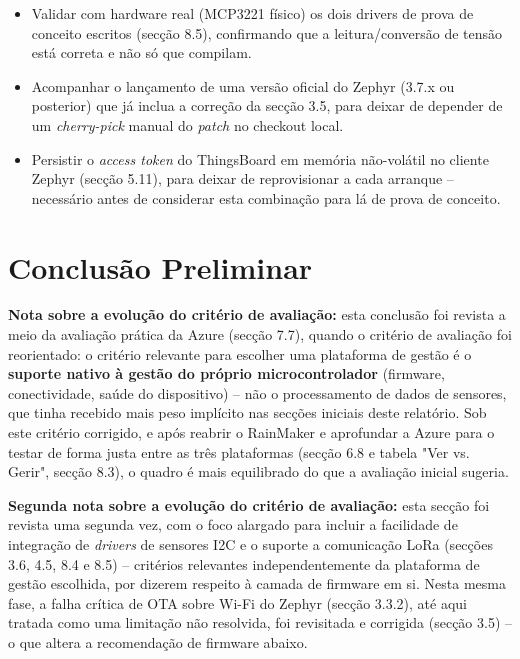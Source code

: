 \documentclass[a4paper,12pt]{article}
\begin{document}
\begin{itemize}
    \item Validar com hardware real (MCP3221 físico) os dois drivers de prova de conceito escritos (secção 8.5), confirmando que a leitura/conversão de tensão está correta e não só que compilam.
    \item Acompanhar o lançamento de uma versão oficial do Zephyr (3.7.x ou posterior) que já inclua a correção da secção 3.5, para deixar de depender de um \textit{cherry-pick} manual do \textit{patch} no checkout local.
    \item Persistir o \textit{access token} do ThingsBoard em memória não-volátil no cliente Zephyr (secção 5.11), para deixar de reprovisionar a cada arranque -- necessário antes de considerar esta combinação para lá de prova de conceito.
\end{itemize}

\section{Conclusão Preliminar}
\textbf{Nota sobre a evolução do critério de avaliação:} esta conclusão foi revista a meio da avaliação prática da Azure (secção 7.7), quando o critério de avaliação foi reorientado: o critério relevante para escolher uma plataforma de gestão é o \textbf{suporte nativo à gestão do próprio microcontrolador} (firmware, conectividade, saúde do dispositivo) -- não o processamento de dados de sensores, que tinha recebido mais peso implícito nas secções iniciais deste relatório. Sob este critério corrigido, e após reabrir o RainMaker e aprofundar a Azure para o testar de forma justa entre as três plataformas (secção 6.8 e tabela "Ver vs. Gerir", secção 8.3), o quadro é mais equilibrado do que a avaliação inicial sugeria.

\textbf{Segunda nota sobre a evolução do critério de avaliação:} esta secção foi revista uma segunda vez, com o foco alargado para incluir a facilidade de integração de \textit{drivers} de sensores I2C e o suporte a comunicação LoRa (secções 3.6, 4.5, 8.4 e 8.5) -- critérios relevantes independentemente da plataforma de gestão escolhida, por dizerem respeito à camada de firmware em si. Nesta mesma fase, a falha crítica de OTA sobre Wi-Fi do Zephyr (secção 3.3.2), até aqui tratada como uma limitação não resolvida, foi revisitada e corrigida (secção 3.5) -- o que altera a recomendação de firmware abaixo.
\end{document}
